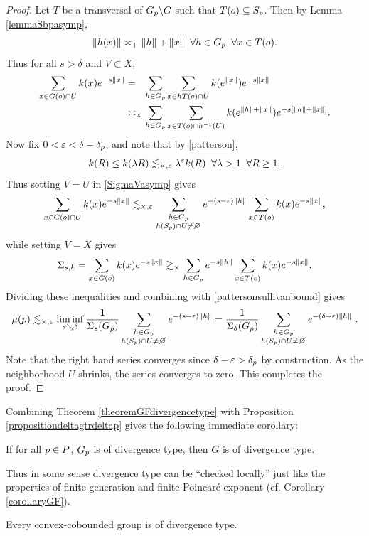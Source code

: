 \begin{proof}
Let $T$ be a transversal of $G_p\backslash G$ such that $T(o) \subseteq S_p$. Then by Lemma \ref{lemmaSbpasymp},
\[
\|h(x)\| \asymp_+ \|h\| + \|x\| \;\;\forall h\in G_p \;\;\forall x\in T(o).
\]
Thus for all $s > \delta$ and $V\subset X$,
\begin{equation}
\label{SigmaVasymp}
\begin{split}
\sum_{x\in G(\zero)\cap U} k(x) e^{-s\dox x}
&=_\pt \sum_{h\in G_\bp} \sum_{x\in hT(\zero)\cap U} k(e^{\dox x}) e^{-s\dox x}\\
&\asymp_\times \sum_{h\in G_\bp} \sum_{x\in T(\zero)\cap h^{-1}(U)} k(e^{\dogo h + \dox x}) e^{-s[\dogo h + \dox x]}.
\end{split}
\end{equation}
Now fix $0 < \varepsilon < \delta - \delta_p$, and note that by \eqref{patterson},
\[
k(R) \leq k(\lambda R) \lesssim_{\times,\varepsilon} \lambda^\varepsilon k(R) \;\;\forall \lambda > 1 \;\;\forall R \geq 1.
\]
Thus setting $V = U$ in \eqref{SigmaVasymp} gives
\[
\sum_{x\in G(\zero)\cap U} k(x) e^{-s\dox x} \lesssim_{\times,\epsilon}  \sum_{\substack{h\in G_\bp \\ h(S_\bp)\cap U\neq\smallemptyset}} e^{-(s - \epsilon)\dogo h} \sum_{x\in T(\zero)} k(x)e^{-s\dox x},
\]
while setting $V = X$ gives
\begin{align*}
\Sigma_{s,k} = \sum_{x\in G(o)} k(x) e^{-s\|x\|} \gtrsim_\times \sum_{h\in G_p} e^{-s\|h\|} \sum_{x\in T(o)} k(x)e^{-s\|x\|}.
\end{align*}
Dividing these inequalities and combining with \eqref{pattersonsullivanbound} gives
\[
\mu(\bp)
\lesssim_{\times,\epsilon} \liminf_{s\searrow\delta} \frac{1}{\Sigma_s(G_\bp)} \sum_{\substack{h\in G_\bp \\ h(S_\bp)\cap U \neq\smallemptyset}} e^{-(s - \epsilon)\dogo h}
= \frac{1}{\Sigma_\delta(G_\bp)} \sum_{\substack{h\in G_\bp \\ h(S_\bp)\cap U \neq\smallemptyset}} e^{-(\delta - \epsilon)\dogo h} ~.
\]
Note that the right hand series converges since $\delta - \varepsilon > \delta_p$ by construction. As the neighborhood $U$ shrinks, the series converges to zero. This completes the proof.
\end{proof}

Combining Theorem \ref{theoremGFdivergencetype} with Proposition \ref{propositiondeltagtrdeltap} gives the following immediate corollary:

\begin{corollary}
If for all $p\in P$, $G_p$ is of divergence type, then $G$ is of divergence type.
\end{corollary}
Thus in some sense divergence type can be ``checked locally'' just like the properties of finite generation and finite Poincar\'e exponent (cf. Corollary \ref{corollaryGF}).
\begin{corollary}
Every convex-cobounded group is of divergence type.
\end{corollary}

